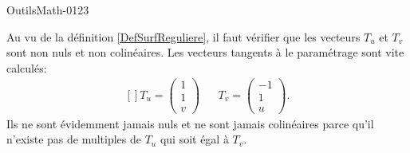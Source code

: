
\begin{corrige}{OutilsMath-0123}

    Au vu de la définition \ref{DefSurfReguliere}, il faut vérifier que les vecteurs \( T_u\) et \( T_v\) sont non nuls et non colinéaires. Les vecteurs tangents à le paramétrage sont vite calculés:
    \begin{equation}
        \begin{aligned}[]
            T_u=\begin{pmatrix}
                1    \\ 
                1    \\ 
                v    
            \end{pmatrix}&&T_v=\begin{pmatrix}
                -1    \\ 
                1    \\ 
                u    
            \end{pmatrix}.
        \end{aligned}
    \end{equation}
    Ils ne sont évidemment jamais nuls et ne sont jamais colinéaires parce qu'il n'existe pas de multiples de \( T_u\) qui soit égal à \( T_v\).


\end{corrige}

